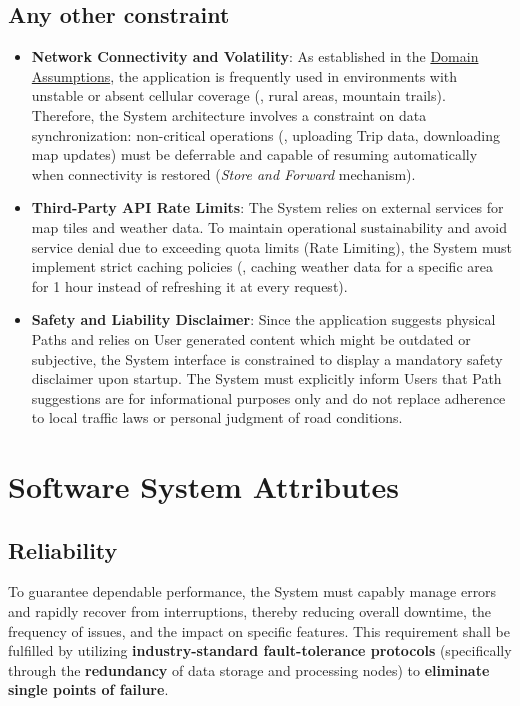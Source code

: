 \subsection{Any other constraint}
\begin{itemize}
    \item \textbf{Network Connectivity and Volatility}: 
    As established in the \hyperref[domain_assumptions]{Domain Assumptions}, the application is frequently used in environments with unstable or absent cellular coverage (\eg, rural areas, mountain trails). Therefore, the System architecture involves a constraint on data synchronization: non-critical operations (\eg, uploading Trip data, downloading map updates) must be deferrable and capable of resuming automatically when connectivity is restored (\emph{Store and Forward} mechanism).

    \item \textbf{Third-Party API Rate Limits}: 
    The System relies on external services for map tiles and weather data. To maintain operational sustainability and avoid service denial due to exceeding quota limits (Rate Limiting), the System must implement strict caching policies (\eg, caching weather data for a specific area for 1 hour instead of refreshing it at every request).

    \item \textbf{Safety and Liability Disclaimer}: 
    Since the application suggests physical Paths and relies on User generated content which might be outdated or subjective, the System interface is constrained to display a mandatory safety disclaimer upon startup. The System must explicitly inform Users that Path suggestions are for informational purposes only and do not replace adherence to local traffic laws or personal judgment of road conditions.
\end{itemize}
\section{Software System Attributes}

\subsection{Reliability}
To guarantee dependable performance, the System must capably manage errors and rapidly recover from interruptions, thereby reducing overall downtime, the frequency of issues, and the impact on specific features. This requirement shall be fulfilled by utilizing \textbf{industry-standard fault-tolerance protocols} (specifically through the \textbf{redundancy} of data storage and processing nodes) to \textbf{eliminate single points of failure}.

